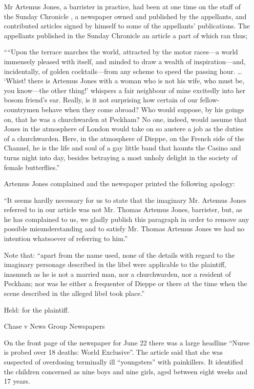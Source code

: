 \documentclass[]{article}
\begin{document}
Mr Artemus Jones, a barrister in practice, had been at one time on the
staff of the Sunday Chronicle , a newspaper owned and published by the
appellants, and contributed articles signed by himself to some of the
appellants' publications. The appellants published in the Sunday
Chronicle an article a part of which ran thus;

````Upon the terrace marches the world, attracted by the motor races---a
world immensely pleased with itself, and minded to draw a wealth of
inspiration---and, incidentally, of golden cocktails---from any scheme
to speed the passing hour. \ldots{} `Whist! there is Artemus Jones with
a woman who is not his wife, who must be, you know---the other thing!'
whispers a fair neighbour of mine excitedly into her bosom friend's ear.
Really, is it not surprising how certain of our fellow-countrymen behave
when they come abroad? Who would suppose, by his goings on, that he was
a churchwarden at Peckham? No one, indeed, would assume that Jones in
the atmosphere of London would take on so austere a job as the duties of
a churchwarden. Here, in the atmosphere of Dieppe, on the French side of
the Channel, he is the life and soul of a gay little band that haunts
the Casino and turns night into day, besides betraying a most unholy
delight in the society of female butterflies.''

Artemus Jones complained and the newspaper printed the following
apology:

``It seems hardly necessary for us to state that the imaginary Mr.
Artemus Jones referred to in our article was not Mr. Thomas Artemus
Jones, barrister, but, as he has complained to us, we gladly publish
this paragraph in order to remove any possible misunderstanding and to
satisfy Mr. Thomas Artemus Jones we had no intention whatsoever of
referring to him.''

Note that: ``apart from the name used, none of the details with regard
to the imaginary personage described in the libel were applicable to the
plaintiff, inasmuch as he is not a married man, nor a churchwarden, nor
a resident of Peckham; nor was he either a frequenter of Dieppe or there
at the time when the scene described in the alleged libel took place.''

Held: for the plaintiff.

Chase v News Group Newspapers

On the front page of the newspaper for June 22 there was a large
headline ``Nurse is probed over 18 deaths: World Exclusive''. The
article said that she was suspected of overdosing terminally ill
``youngsters'' with painkillers. It identified the children concerned as
nine boys and nine girls, aged between eight weeks and 17 years.
\end{document}
